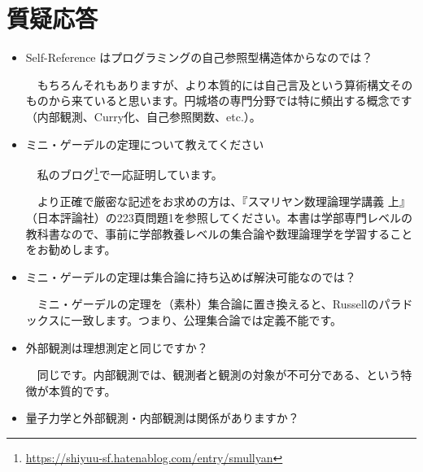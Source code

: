 \documentclass[10pt, a5paper, twoside]{jsarticle}
\begin{document}
	\section{質疑応答}

		\begin{itemize}

			\item Self-Reference はプログラミングの自己参照型構造体からなのでは？

			\vspace{1mm}

			　もちろんそれもありますが、より本質的には自己言及という算術構文そのものから来ていると思います。円城塔の専門分野では特に頻出する概念です（内部観測、Curry化、自己参照関数、etc.）。

			\vspace{2mm}

			\item ミニ・ゲーデルの定理について教えてください

			\vspace{1mm}

			　私のブログ\footnote{\url{https://shiyuu-sf.hatenablog.com/entry/smullyan}}で一応証明しています。

			　より正確で厳密な記述をお求めの方は、『スマリヤン数理論理学講義 上』（日本評論社）の223頁問題1を参照してください。本書は学部専門レベルの教科書なので、事前に学部教養レベルの集合論や数理論理学を学習することをお勧めします。

			\vspace{2mm}

			\item ミニ・ゲーデルの定理は集合論に持ち込めば解決可能なのでは？

			\vspace{1mm}
			
			　ミニ・ゲーデルの定理を（素朴）集合論に置き換えると、Russellのパラドックスに一致します。つまり、公理集合論では定義不能です。

			\vspace{2mm}

			\item 外部観測は理想測定と同じですか？

			\vspace{1mm}

			　同じです。内部観測では、観測者と観測の対象が不可分である、という特徴が本質的です。

			\vspace{2mm}

			\item 量子力学と外部観測・内部観測は関係がありますか？


\end{itemize}
\end{document}
